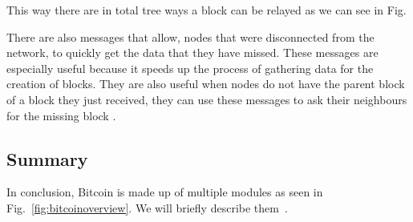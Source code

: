 This way there are in total tree ways a block can be relayed as we can see in Fig. %







There are also messages that allow, nodes that were disconnected from the network, to quickly get the data that they have missed. These messages are especially useful because it speeds up the process of gathering data for the creation of blocks. They are also useful when nodes do not have the parent block of a block they just received, they can use these messages to ask their neighbours for the missing block \cite{bitcoincorewiki}.

\subsection{Summary}
In conclusion, Bitcoin is made up of multiple modules as seen in  Fig.~\ref{fig:bitcoinoverview}. We will briefly describe them~\cite{bitcoinwiki}.

